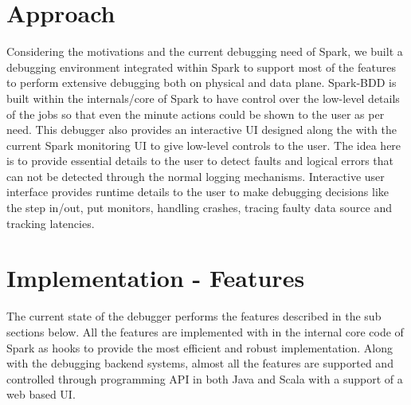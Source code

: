 \documentclass{acm_proc_article-sp}
\begin{document}
\section{Approach}
Considering the motivations and the current debugging need of Spark, we built a debugging environment integrated within Spark to support most of the features to perform extensive debugging both on physical and data plane. Spark-BDD is built within the internals/core of Spark to have control over the low-level details of the jobs so that even the minute actions could be shown to the user as per need. This debugger also provides an interactive UI designed along the with the current Spark monitoring UI to give low-level controls to the user.  The idea here is to provide essential details to the user to detect faults and logical errors that can not be detected through the normal logging mechanisms. Interactive user interface provides runtime details to the user to make debugging decisions like the step in/out, put monitors, handling crashes, tracing faulty data source and tracking latencies.

\section{Implementation - Features}
The current state of the debugger performs the features described in the sub sections below. All the features are implemented with in the internal core code of Spark as hooks to provide the most efficient and robust implementation. Along with the debugging backend systems, almost all the features are supported and controlled through programming API in both Java and Scala with a support of a web based UI.
\end{document}
